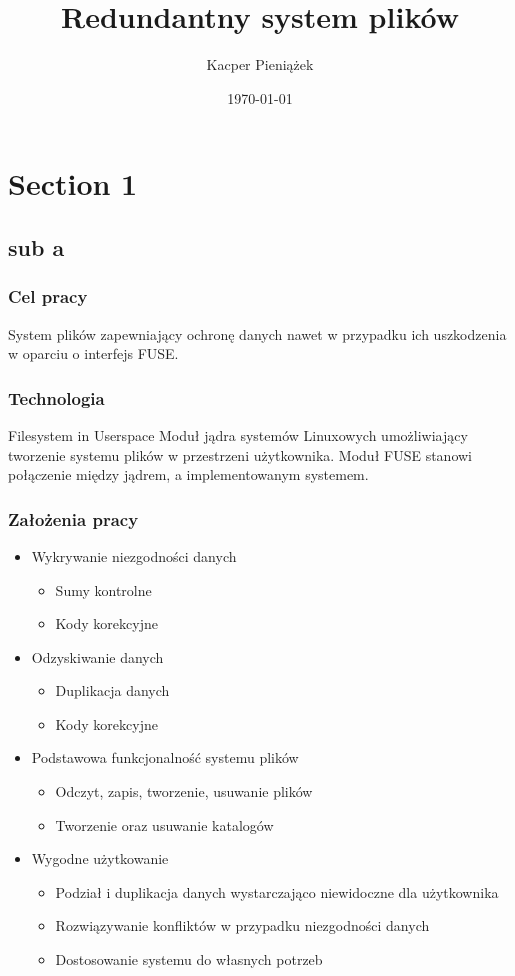 \documentclass{beamer}
\title{Redundantny system plików}
\author{Kacper Pieniążek}
\date{\today}
\begin{document}
	\begin{frame}
		\titlepage
	\end{frame}

	\section{Section 1}
	\subsection{sub a}
	
	\begin{frame}
		\frametitle{Cel pracy}
			System plików zapewniający ochronę danych nawet w przypadku ich uszkodzenia w oparciu o interfejs FUSE.
	\end{frame}
	
	\begin{frame}
		\frametitle{Technologia}
            \begin{block}{Filesystem in Userspace}
			    Moduł jądra systemów Linuxowych umożliwiający tworzenie systemu plików w przestrzeni użytkownika. Moduł FUSE stanowi połączenie między jądrem, a implementowanym systemem.
            \end{block}
	\end{frame}


	\begin{frame}
		\frametitle{Założenia pracy}
		\begin{itemize}
			\item Wykrywanie niezgodności danych
				\begin{itemize}
					\item Sumy kontrolne
					\item Kody korekcyjne
				\end{itemize}
			\pause
			\item Odzyskiwanie danych
			\begin{itemize}
				\item Duplikacja danych
				\item Kody korekcyjne
			\end{itemize}
			\pause
			\item Podstawowa funkcjonalność systemu plików
			\begin{itemize}
				\item Odczyt, zapis, tworzenie, usuwanie plików
                \item Tworzenie oraz usuwanie katalogów
			\end{itemize}
			\pause
			\item Wygodne użytkowanie
			\begin{itemize}
				\item Podział i duplikacja danych wystarczająco niewidoczne dla użytkownika
				\item Rozwiązywanie konfliktów w przypadku niezgodności danych
				\item Dostosowanie systemu do własnych potrzeb
			\end{itemize}
		\end{itemize}
	\end{frame}
	
\end{document}

